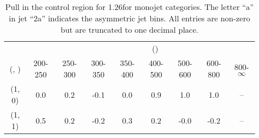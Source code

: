 \begin{table}[h!]
\tiny
\centering
\caption{Pull in the \mj control region for 1.26\ifb for monojet categories. The letter ``a'' in jet \eg ``2a''  indicates the asymmetric jet bins. All entries are non-zero but are truncated to one decimal place.\label{tab:pullsep_mu_ewk_mono}}
\begin{tabular}
{ccccccccc}
	\hline\hline
&	& \multicolumn{8}{c}{\scalht (\gev)} \\ 
	 (\njet,  \nb) & 200-250 & 250-300 & 300-350 & 350-400 & 400-500 & 500-600 & 600-800 & 800-$\infty$ \\ [0.8ex] 
\hline
	(1, 0) & 0.0 & 0.2 & -0.1 & 0.0 & 0.9 & 1.0 & 1.0 & -- \\[0.5ex] 
	(1, 1) & 0.5 & 0.2 & -0.2 & 0.3 & 0.2 & -0.0 & -0.2 & -- \\[0.5ex] 
	\hline
	\hline
\end{tabular}
\end{table}
